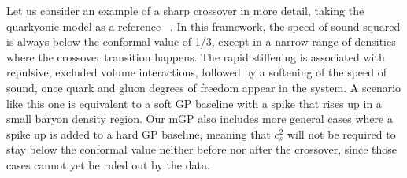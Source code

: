 \documentclass[aps,prd,nofootinbib,tightenlines,notitlepage,floatfix,superscriptaddress,showkeys,twocolumn]{revtex4-1}
\begin{document}
Let us consider an example of a sharp crossover in more detail, taking the quarkyonic model as a reference~ \cite{McLerran:2018hbz,Fujimoto:2023ioi}. In this framework, the speed of sound squared is always below the conformal value of 1/3, except in a narrow range of densities where the crossover transition happens. The rapid stiffening is associated with repulsive, excluded volume interactions, followed by a softening of the speed of sound, once quark and gluon degrees of freedom appear in the system. A scenario like this one is equivalent to a soft GP baseline with a spike that rises up in a small baryon density region. Our mGP also includes more general cases where a spike up is added to a hard GP baseline, meaning that $c_s^2$ will not be required to stay below the conformal value neither before nor after the crossover, since those cases cannot yet be ruled out by the data.
\end{document}
